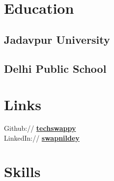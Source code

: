 \documentclass[]{deedy-resume-openfont}
\begin{document}
%
%
\lastupdated

%
%

%
%

\begin{minipage}[t]{0.33\textwidth} 


\section{Education} 

\subsection{Jadavpur University}
\sectionsep

\subsection{Delhi Public School}
\sectionsep


\section{Links} 
Github:// \href{https://github.com/techswappy}{\bf techswappy} \\
LinkedIn://  \href{https://www.linkedin.com/in/swapnildey}{\bf swapnildey} \\


\section{Skills}

\end{minipage}
\end{document}
